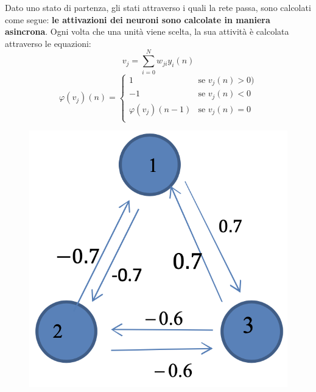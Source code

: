 Dato uno stato di partenza, gli stati attraverso i quali la rete passa, sono calcolati come segue: \textbf{le attivazioni dei neuroni sono calcolate in maniera asincrona}. Ogni volta che una unità viene scelta, la sua attività è calcolata attraverso le equazioni:
\begin{equation}
    v_j=\sum_{i=0}^Nw_{ji}y_i(n)
\end{equation}
\begin{equation}
    \varphi(v_j)(n)=
        \begin{cases}
            1                   & \text{se } v_j(n)>0)\\
            -1                  & \text{se } v_j(n)<0\\
            \varphi(v_j)(n-1)   & \text{se } v_j(n)=0\\
        \end{cases}
\end{equation}
\begin{figure}[!h]
    \includegraphics[scale=.35]{images/hopfield_networks/ex01.png}
    \centering
\end{figure}





